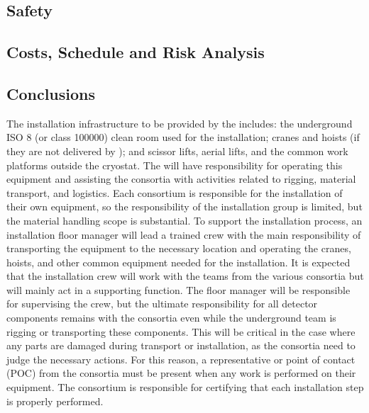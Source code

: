 \subsection{Safety}
\label{sec:fdsp-tc-inst-safety}


\subsection{Costs, Schedule and Risk Analysis}
\label{sec:fdsp-tc-inst-cost}

\subsection{Conclusions}
\label{sec:fdsp-tc-inst-concl}



The installation infrastructure to be provided by the 
includes: the underground ISO 8 (or class \num{100000}) clean room
used for the installation; cranes and hoists (if they are not
delivered by ); and scissor lifts, aerial lifts, and the common
work platforms outside the cryostat. The  will have
responsibility for operating this equipment and assisting the
consortia with activities related to rigging, material transport, and
logistics. Each consortium is responsible for the installation of
their own equipment, so the responsibility of the installation group is
limited, but the material handling scope is substantial. To support
the installation process, an installation floor manager will lead a
trained crew with the main responsibility of transporting the
equipment to the necessary location and operating the cranes, hoists,
and other common equipment needed for the installation. It is expected
that the installation crew will work with the teams from the various
consortia but will mainly act in a supporting function. The
 floor manager will be responsible for supervising the
 crew, but the ultimate responsibility for all detector
components remains with the consortia even while the underground
team is rigging or transporting these components.  This will be
critical in the case where any parts are damaged during transport or installation,
as the consortia need to judge the necessary actions. 
For this reason,
a representative or point of contact (POC) from the consortia must be
present when any work is performed on their equipment. The consortium
is responsible for certifying that each installation step is properly
performed.

